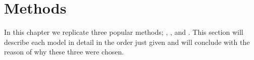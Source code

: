 \section{Methods}
\label{section:repro_methods}

In this chapter we replicate three popular methods; \cite{repro_vo_2015}, \cite{repro_wang_2017}, and \cite{repro_tang_2016}. This section will describe each model in detail in the order just given and will conclude with the reason of why these three were chosen.

%
%




